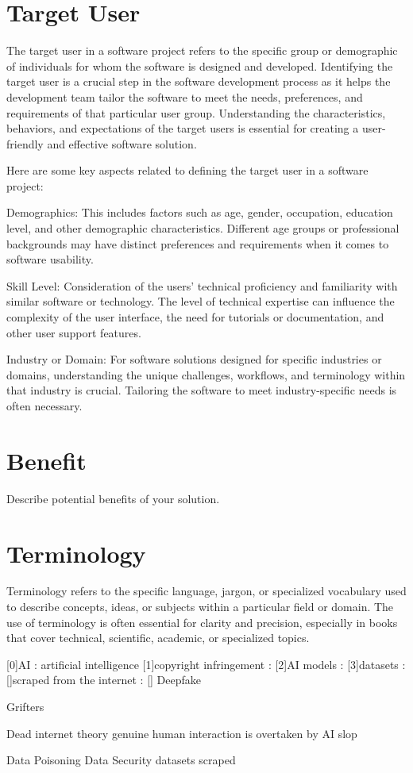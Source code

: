 \section{Target User}
\label{section:target-user}

The target user in a software project refers to the specific
group or demographic of individuals for whom the software is designed and
developed. Identifying the target user is a crucial step in the software
development process as it helps the development team tailor the software to
meet the needs, preferences, and requirements of that particular user group.
Understanding the characteristics, behaviors, and expectations of the target
users is essential for creating a user-friendly and effective software solution.

Here are some key aspects related to defining the target user in a software project:

Demographics: This includes factors such as age, gender,
occupation, education level, and other demographic characteristics. Different
age groups or professional backgrounds may have distinct preferences and
requirements when it comes to software usability.

Skill Level: Consideration of the users' technical proficiency and
familiarity with similar software or technology. The level of technical expertise
can influence the complexity of the user interface, the need for tutorials or
documentation, and other user support features.

Industry or Domain: For software solutions designed for specific
industries or domains, understanding the unique challenges, workflows, and
terminology within that industry is crucial. Tailoring the software to meet
industry-specific needs is often necessary.

\section{Benefit}
\label{section:benefit}

Describe potential benefits of your solution.

\section{Terminology}
\label{section:terminology}

Terminology refers to the specific language, jargon, or
specialized vocabulary used to describe concepts, ideas, or subjects within a
particular field or domain. The use of terminology is often essential for clarity
and precision, especially in books that cover technical, scientific, academic, or
specialized topics.

[0]AI : artificial intelligence
[1]copyright infringement :
[2]AI models : 
[3]datasets : 
[]scraped from the internet :
[]
Deepfake

Grifters

Dead internet theory
    genuine human interaction is overtaken by AI slop

Data Poisoning
Data Security
datasets
scraped
